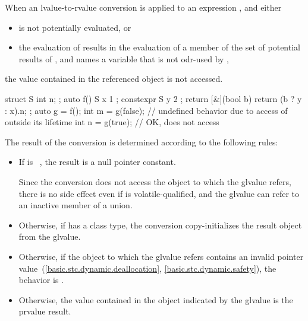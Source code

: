 \pnum
When an lvalue-to-rvalue conversion
is applied to an expression , and either
\begin{itemize}
\item {} is not potentially evaluated, or
\item the evaluation of  results in the evaluation of a member
       of the set of potential results of , and 
      names a variable  that is not odr-used by
      ,
\end{itemize}
the value contained in the referenced object is not accessed.
\begin{example}
\begin{codeblock}
struct S { int n; };
auto f() {
  S x { 1 };
  constexpr S y { 2 };
  return [&](bool b) { return (b ? y : x).n; };
}
auto g = f();
int m = g(false);   // undefined behavior due to access of  outside its lifetime
int n = g(true);    // OK, does not access 
\end{codeblock}
\end{example}

\pnum
The result of the conversion is determined according to the
following rules:

\begin{itemize}

\item If  is \cv{}~, the result is a
null pointer constant.
\begin{note}
Since the conversion does not access the object to which the glvalue refers,
there is no side effect even if  is volatile-qualified, and
the glvalue can refer to an inactive member of a union.
\end{note}

\item Otherwise, if  has a class
type, the conversion copy-initializes the result object from
the glvalue.

\item Otherwise, if the object to which the glvalue refers contains an invalid
pointer value~(\ref{basic.stc.dynamic.deallocation},
\ref{basic.stc.dynamic.safety}), the behavior is
.

\item Otherwise, the value contained in the object indicated by the
glvalue is the prvalue result.

\end{itemize}

